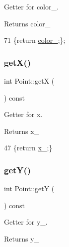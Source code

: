 Getter for color\+\_\+. 

\begin{DoxyReturn}{Returns}
color\+\_\+ 
\end{DoxyReturn}

\begin{DoxyCode}
71 \{\textcolor{keywordflow}{return} \mbox{\hyperlink{class_point_af3333647d73989850d2fbf64d14eb9cb}{color\_}};\};
\end{DoxyCode}
\mbox{\label{class_point_ac9d5859db121c7d1b89ca89266dca0a3}} 
\subsubsection{\texorpdfstring{get\+X()}{getX()}}
{\footnotesize\ttfamily int Point\+::getX (\begin{DoxyParamCaption}{ }\end{DoxyParamCaption}) const\hspace{0.3cm}{\ttfamily [inline]}}



Getter for x. 

\begin{DoxyReturn}{Returns}
x\+\_\+ 
\end{DoxyReturn}

\begin{DoxyCode}
47 \{\textcolor{keywordflow}{return} \mbox{\hyperlink{class_point_acfe156c55546f7e551fb54c7ea08a6cb}{x\_}};\}
\end{DoxyCode}
\mbox{\label{class_point_a86d10ff46e08462c45b15a8c7ef62d61}} 
\subsubsection{\texorpdfstring{get\+Y()}{getY()}}
{\footnotesize\ttfamily int Point\+::getY (\begin{DoxyParamCaption}{ }\end{DoxyParamCaption}) const\hspace{0.3cm}{\ttfamily [inline]}}



Getter for y\+\_\+. 

\begin{DoxyReturn}{Returns}
y\+\_\+ 
\end{DoxyReturn}

